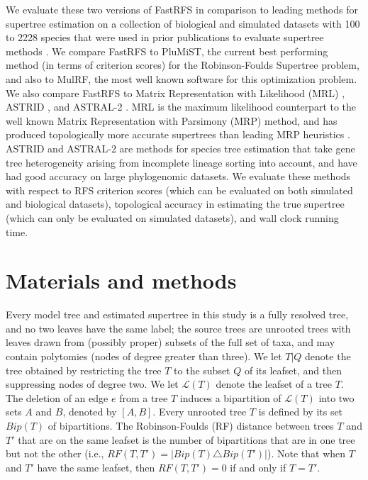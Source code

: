 We evaluate these two versions of FastRFS in comparison to 
leading methods for supertree estimation
on a collection of biological and simulated datasets
 with 100 to 2228 species
that were used in prior publications to evaluate supertree methods
\cite{smidgen,superfine,mrl}.
We compare FastRFS to 
PluMiST, the current best performing method
(in terms of criterion scores)
 for the Robinson-Foulds Supertree problem,
and also to
MulRF, the most well known software for this optimization problem.
We also compare FastRFS to 
 Matrix Representation with Likelihood (MRL) \cite{mrl},  
 ASTRID \cite{ASTRID}, and  ASTRAL-2 \cite{ASTRAL2}.
MRL is the maximum likelihood counterpart
to the well known Matrix Representation with Parsimony (MRP) method, and
has produced topologically more accurate supertrees than 
leading MRP heuristics \cite{mrl}. ASTRID and ASTRAL-2 are
methods for species tree estimation that  take 
gene tree heterogeneity arising from incomplete lineage sorting into account,
and have had good accuracy on large phylogenomic datasets.
We evaluate these methods with respect to
RFS criterion scores (which can
be evaluated on both simulated and biological datasets), 
topological accuracy in estimating the true supertree (which
can only be evaluated on simulated datasets), and wall clock running time.




\section{Materials and methods}



Every model tree and estimated supertree in this study is a 
fully resolved tree,
and no two leaves have the same label; the source
trees are unrooted trees with leaves drawn from 
(possibly proper)
subsets of the full set of taxa, and may contain
polytomies (nodes of degree greater than three).
We let $T|Q$ denote the tree obtained by restricting the tree $T$ to the subset $Q$ of its leafset, and then suppressing nodes of degree two. 
We let $\mathcal{L}(T)$ denote the leafset of a tree $T$. 
The deletion of an edge $e$ from a tree $T$ induces a 
bipartition of $\mathcal{L}(T)$ into two sets $A$ and $B$,
denoted by $[A,B]$. Every unrooted 
tree $T$ is defined by its set $Bip(T)$ of bipartitions. 
The Robinson-Foulds (RF) distance between trees $T$ and $T'$ that are on the same leafset is the number of bipartitions that are in one tree but not the other (i.e., $RF(T,T') = |Bip(T) \triangle Bip(T')|$). Note that when $T$ and $T'$ have the same leafset, then $RF(T,T')=0$ if and only if $T=T'$.

